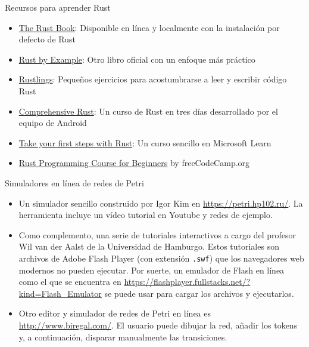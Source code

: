 \documentclass{beamer}
\begin{document}
\begin{frame}{Recursos para aprender Rust}
  \begin{itemize}
    \item \href{https://doc.rust-lang.org/stable/book/}{The Rust Book}:
          Disponible en línea y localmente con la instalación por defecto de Rust
    \item \href{https://doc.rust-lang.org/rust-by-example/}{Rust by Example}:
          Otro libro oficial con un enfoque más práctico
    \item \href{https://github.com/rust-lang/rustlings}{Rustlings}:
          Pequeños ejercicios para acostumbrarse a leer y escribir código Rust
    \item \href{https://google.github.io/comprehensive-rust/}{Comprehensive Rust}:
          Un curso de Rust en tres días desarrollado por el equipo de Android
    \item \href{https://learn.microsoft.com/en-us/training/paths/rust-first-steps/}{Take your first steps with Rust}:
          Un curso sencillo en Microsoft Learn
    \item \href{https://www.youtube.com/watch?v=MsocPEZBd-M}{Rust Programming Course for Beginners} by freeCodeCamp.org
  \end{itemize}
\end{frame}

\begin{frame}{Simuladores en línea de redes de Petri}
  \begin{itemize}
    \item Un simulador sencillo construido por Igor Kim en \url{https://petri.hp102.ru/}.
          La herramienta incluye un vídeo tutorial en Youtube y redes de ejemplo.
    \item Como complemento, una serie de tutoriales interactivos a cargo del profesor Wil van der Aalst
          de la Universidad de Hamburgo. Estos tutoriales son archivos de Adobe Flash Player (con extensión \texttt{.swf})
          que los navegadores web modernos no pueden ejecutar.
          Por suerte, un emulador de Flash en línea como el que se encuentra en \url{https://flashplayer.fullstacks.net/?kind=Flash_Emulator}
          se puede usar para cargar los archivos y ejecutarlos.
    \item Otro editor y simulador de redes de Petri en línea es \url{http://www.biregal.com/}.
          El usuario puede dibujar la red, añadir los tokens y, a continuación, disparar manualmente las transiciones.
  \end{itemize}
\end{frame}
\end{document}
